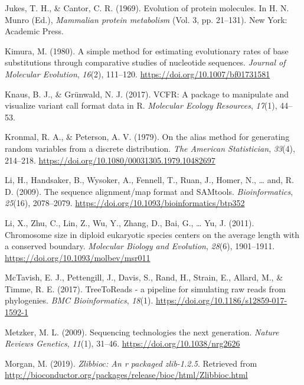 \documentclass[12pt,]{article}
\begin{document}
\leavevmode\hypertarget{ref-JC69}{}%
Jukes, T. H., \& Cantor, C. R. (1969). Evolution of protein molecules. In H. N. Munro (Ed.), \emph{Mammalian protein metabolism} (Vol. 3, pp. 21--131). New York: Academic Press.

\leavevmode\hypertarget{ref-Kimura_1980}{}%
Kimura, M. (1980). A simple method for estimating evolutionary rates of base substitutions through comparative studies of nucleotide sequences. \emph{Journal of Molecular Evolution}, \emph{16}(2), 111--120. \url{https://doi.org/10.1007/bf01731581}

\leavevmode\hypertarget{ref-Knaus_2017}{}%
Knaus, B. J., \& Grünwald, N. J. (2017). VCFR: A package to manipulate and visualize variant call format data in R. \emph{Molecular Ecology Resources}, \emph{17}(1), 44--53.

\leavevmode\hypertarget{ref-Kronmal_1979}{}%
Kronmal, R. A., \& Peterson, A. V. (1979). On the alias method for generating random variables from a discrete distribution. \emph{The American Statistician}, \emph{33}(4), 214--218. \url{https://doi.org/10.1080/00031305.1979.10482697}

\leavevmode\hypertarget{ref-Li_2009}{}%
Li, H., Handsaker, B., Wysoker, A., Fennell, T., Ruan, J., Homer, N., \ldots{} and, R. D. (2009). The sequence alignment/map format and SAMtools. \emph{Bioinformatics}, \emph{25}(16), 2078--2079. \url{https://doi.org/10.1093/bioinformatics/btp352}

\leavevmode\hypertarget{ref-Li_2011}{}%
Li, X., Zhu, C., Lin, Z., Wu, Y., Zhang, D., Bai, G., \ldots{} Yu, J. (2011). Chromosome size in diploid eukaryotic species centers on the average length with a conserved boundary. \emph{Molecular Biology and Evolution}, \emph{28}(6), 1901--1911. \url{https://doi.org/10.1093/molbev/msr011}

\leavevmode\hypertarget{ref-McTavish_2017}{}%
McTavish, E. J., Pettengill, J., Davis, S., Rand, H., Strain, E., Allard, M., \& Timme, R. E. (2017). TreeToReads - a pipeline for simulating raw reads from phylogenies. \emph{BMC Bioinformatics}, \emph{18}(1). \url{https://doi.org/10.1186/s12859-017-1592-1}

\leavevmode\hypertarget{ref-Metzker_2009}{}%
Metzker, M. L. (2009). Sequencing technologies the next generation. \emph{Nature Reviews Genetics}, \emph{11}(1), 31--46. \url{https://doi.org/10.1038/nrg2626}

\leavevmode\hypertarget{ref-Morgan_2019}{}%
Morgan, M. (2019). \emph{Zlibbioc: An r packaged zlib-1.2.5}. Retrieved from \url{http://bioconductor.org/packages/release/bioc/html/Zlibbioc.html}
\end{document}
